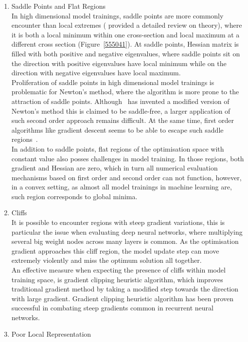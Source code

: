 \begin{enumerate}
    \item Saddle Points and Flat Regions\\
In high dimensional model trainings, saddle points are more commonly encounter than local extremes (\citet{DauphinPGCGB14} provided a detailed review on theory), where it is both a local minimum within one cross-section and local maximum at a different cross section (Figure~\ref{555041}). At saddle points, Hessian matrix is filled with both positive and negative eigenvalues, where saddle points sit on the direction with positive eigenvalues have local minimum while on the direction with negative eigenvalues have local maximum. \\
Proliferation of saddle points in high dimensional model trainings is problematic for Newton's method, where the algorithm is more prone to the attraction of saddle points. Although~\citet{DauphinPGCGB14} has invented a modified version of Newton's method this is claimed to be saddle-free, a larger application of such second order approach remains difficult. At the same time, first order algorithms like gradient descent seems to be able to escape such saddle regions~\cite{GoodfellowV14}.\\
In addition to saddle points, flat regions of the optimisation space with constant value also posses challenges in model training. In those regions, both gradient and Hessian are zero, which in turn all numerical evaluation mechanisms based on first order and second order can not function, however, in a convex setting, as almost all model trainings in machine learning are, such region corresponds to global minima. 
    \item Cliffs \\
It is possible to encounter regions with steep gradient variations, this is particular the issue when evaluating deep neural networks, where multiplying several big weight nodes across many layers is common. As the optimisation gradient approaches this cliff region, the model update step can move extremely violently and miss the optimum solution all together. \\
An effective measure when expecting the presence of cliffs within model training space, is gradient clipping heuristic algorithm, which improves traditional gradient method by taking a modified step towards the direction with large gradient. Gradient clipping heuristic algorithm has been proven successful in combating steep gradients common in recurrent neural networks.~\cite{Pascanu2012UnderstandingTE} 
    \item Poor Local Representation \\

\end{enumerate}
